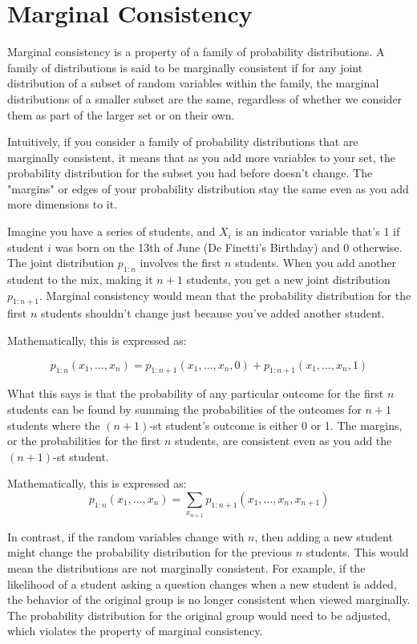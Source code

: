 \documentclass{article}
\begin{document}
\section*{Marginal Consistency}

Marginal consistency is a property of a family of probability distributions. A family of distributions is said to be marginally consistent if for any joint distribution of a subset of random variables within the family, the marginal distributions of a smaller subset are the same, regardless of whether we consider them as part of the larger set or on their own.

Intuitively, if you consider a family of probability distributions that are marginally consistent, it means that as you add more variables to your set, the probability distribution for the subset you had before doesn't change. The "margins" or edges of your probability distribution stay the same even as you add more dimensions to it.


Imagine you have a series of students, and \( X_i \) is an indicator variable that's 1 if student \( i \) was born on the 13th of June (De Finetti's Birthday) and 0 otherwise. The joint distribution \( p_{1:n} \) involves the first \( n \) students. When you add another student to the mix, making it \( n+1 \) students, you get a new joint distribution \( p_{1:n+1} \). Marginal consistency would mean that the probability distribution for the first \( n \) students shouldn't change just because you've added another student.

Mathematically, this is expressed as:

\[ p_{1:n}(x_1, \ldots, x_n) = p_{1:n+1}(x_1, \ldots, x_n, 0) + p_{1:n+1}(x_1, \ldots, x_n, 1) \]

What this says is that the probability of any particular outcome for the first \( n \) students can be found by summing the probabilities of the outcomes for \( n+1 \) students where the \( (n+1) \)-st student's outcome is either 0 or 1. The margins, or the probabilities for the first \( n \) students, are consistent even as you add the \( (n+1) \)-st student.

Mathematically, this is expressed as:
\begin{equation}
p_{1:n}(x_1, \ldots, x_n) = \sum_{x_{n+1}} p_{1:n+1}(x_1, \ldots, x_n, x_{n+1})
\end{equation}

In contrast, if the random variables change with \( n \), then adding a new student might change the probability distribution for the previous \( n \) students. This would mean the distributions are not marginally consistent. For example, if the likelihood of a student asking a question changes when a new student is added, the behavior of the original group is no longer consistent when viewed marginally. The probability distribution for the original group would need to be adjusted, which violates the property of marginal consistency.
\end{document}
